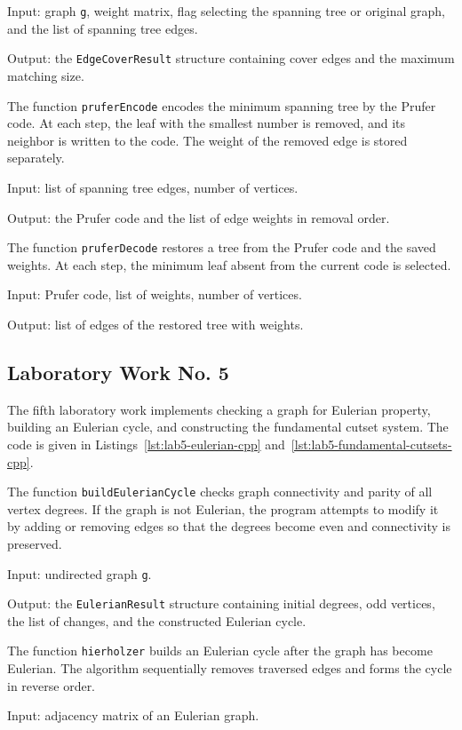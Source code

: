 \documentclass[a4paper,final]{article}
\begin{document}
Input: graph \texttt{g}, weight matrix, flag selecting the spanning tree or original graph, and the list of spanning tree edges.

Output: the \texttt{EdgeCoverResult} structure containing cover edges and the maximum matching size.

The function \texttt{pruferEncode} encodes the minimum spanning tree by the Prufer code. At each step, the leaf with the smallest number is removed, and its neighbor is written to the code. The weight of the removed edge is stored separately.

Input: list of spanning tree edges, number of vertices.

Output: the Prufer code and the list of edge weights in removal order.

The function \texttt{pruferDecode} restores a tree from the Prufer code and the saved weights. At each step, the minimum leaf absent from the current code is selected.

Input: Prufer code, list of weights, number of vertices.

Output: list of edges of the restored tree with weights.

\subsection{Laboratory Work No. 5}

The fifth laboratory work implements checking a graph for Eulerian property, building an Eulerian cycle, and constructing the fundamental cutset system. The code is given in Listings~\ref{lst:lab5-eulerian-cpp} and~\ref{lst:lab5-fundamental-cutsets-cpp}.

The function \texttt{buildEulerianCycle} checks graph connectivity and parity of all vertex degrees. If the graph is not Eulerian, the program attempts to modify it by adding or removing edges so that the degrees become even and connectivity is preserved.

Input: undirected graph \texttt{g}.

Output: the \texttt{EulerianResult} structure containing initial degrees, odd vertices, the list of changes, and the constructed Eulerian cycle.

The function \texttt{hierholzer} builds an Eulerian cycle after the graph has become Eulerian. The algorithm sequentially removes traversed edges and forms the cycle in reverse order.

Input: adjacency matrix of an Eulerian graph.
\end{document}
